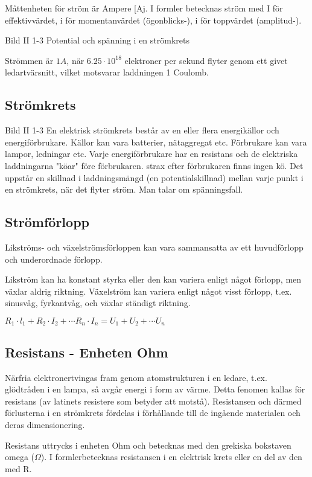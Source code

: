 \documentclass[a4paper,twoside,twocolumn,openright]{book}
\begin{document}
Måttenheten för ström är Ampere [Aj.
I formler betecknas ström med
I för effektivvärdet,
i för momentanvärdet (ögonblicks-),
i för toppvärdet (amplitud-).

Bild II 1-3 Potential och spänning i en strömkrets

Strömmen är $1 A$, när $6.25 \cdot 10^{18}$ elektroner per sekund flyter genom ett givet
ledartvärsnitt, vilket motsvarar laddningen 1 Coulomb.

\subsection{Strömkrets}

Bild II 1-3
En elektrisk strömkrets består av en eller
flera energikällor och energiförbrukare. Källor kan vara batterier, nätaggregat etc. Förbrukare kan vara lampor, ledningar etc.
Varje energiförbrukare har en resistans
och de elektriska laddningarna "köar" före
förbrukaren. strax efter förbrukaren finns
ingen kö.
Det uppstår en skillnad i laddningsmängd
(en potentialskillnad) mellan varje punkt i en
strömkrets, när det flyter ström. Man talar om
spänningsfall.

\subsection{Strömförlopp}

Likströms- och växelströmsförloppen kan vara sammansatta av ett huvudförlopp och
underordnade förlopp.

Likström kan ha konstant styrka eller den kan variera enligt något förlopp,
men växlar aldrig riktning. Växelström kan variera enligt något
visst förlopp, t.ex. sinusvåg, fyrkantvåg, och växlar ständigt riktning.

$R_1 \cdot l_1 + R_2 \cdot I_2 + \cdots R_n \cdot I_n = U_1 + U_2 + \cdots U_n$

\subsection{Resistans - Enheten Ohm}

Närfria elektronertvingas fram genom atomstrukturen i en ledare, t.ex. glödtråden i en
lampa, så avgår energi i form av värme.
Detta fenomen kallas för resistans (av latinets resistere som betyder att motstå).
Resistansen och därmed förlusterna i en
strömkrets fördelas i förhållande till de ingående materialen och deras dimensionering.

Resistans uttrycks i enheten Ohm och betecknas med den grekiska bokstaven
omega ($\Omega$).
I formlerbetecknas resistansen i en elektrisk krets eller en del av den med R.
\end{document}
